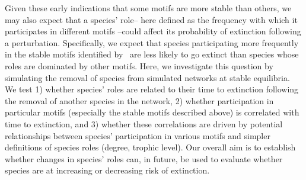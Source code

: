 \documentclass[12pt]{article}
\begin{document}
  Given these early indications that some motifs are more stable than others, we may also expect that a species' role-- here defined as the frequency with which it participates in different motifs --could affect its probability of extinction following a perturbation. Specifically, we expect that species participating more frequently in the stable motifs identified by~\citet{Borrelli2015a} are less likely to go extinct than species whose roles are dominated by other motifs. Here, we investigate this question by simulating the removal of species from simulated networks at stable equilibria. We test 1) whether species' roles are related to their time to extinction following the removal of another species in the network, 2) whether participation in particular motifs (especially the stable motifs described above) is correlated with time to extinction, and 3) whether these correlations are driven by potential relationships between species' participation in various motifs and simpler definitions of species roles (degree, trophic level). Our overall aim is to establish whether changes in species' roles can, in future, be used to evaluate whether species are at increasing or decreasing risk of extinction.


\end{document}
